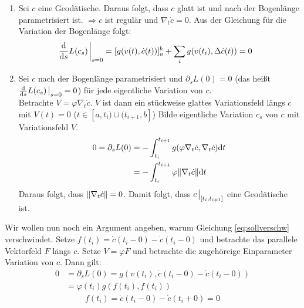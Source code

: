 \begin{bew}
    \begin{enumerate}
        \item Sei $c$ eine Geodätische.
            Daraus folgt, dass $c$ glatt ist und nach der Bogenlänge parametrisiert ist. 
            $\Rightarrow c$ ist regulär und $\nabla_t \dot{c} = 0$. 
            Aus der Gleichung für die Variation der Bogenlänge folgt:
            \begin{align*}
                &\dv{s}L(c_s)\eval_{s = 0} = [g(v(t), \dot{c}(t))]^b_a + \sum_i g(v(t_i), \Delta \dot{c}(t)) = 0
            \end{align*}
        \item Sei $c$ nach der Bogenlänge parametrisiert und $\partial_s L (0) = 0$ (das heißt $\dv{s}L(c_s)\eval_{s=0} = 0$) für jede eigentliche Variation von $c$.\\
            Betrachte $V = \varphi \nabla_t \dot{c}$.
            $V$ ist dann ein stückweise glattes Variationsfeld längs $c$ mit $V(t)=0$ ($t\in [a, t_i) \cup (t_{i + 1}, b]$)
            Bilde eigentliche Variation $c_s$ von $c$ mit Variationsfeld $V$.
            \begin{align}
                \label{eq:sollverschw}
                0 = \partial_s L(0) &= - \int^{t_{i + 1}}_{t_i} g(\varphi \nabla_t \dot{c}, \nabla_t \dot{c}) \dd t\\
                &= - \int^{t_{i+1}}_{t_i} \varphi \norm{\nabla_t \dot{c}} \dd t
            \end{align}
Daraus folgt, dass $\norm{\nabla_t \dot{c}} = 0$.
Damit folgt, dass $c\eval_{[t_i, t_{i+1} ]}$ eine Geodätische ist.
    \end{enumerate}
    Wir wollen nun noch ein Argument angeben, warum Gleichung \ref{eq:sollverschw} verschwindet.
    Setze $f(t_i) = \dot{c}(t_i - 0) - \dot{c}(t_i - 0)$ und betrachte das parallele Vektorfeld $F$ längs $c$.
    Setze $V = \varphi F $ und betrachte die zugehöreige Einparameter Variation von $c$.
    Dann gilt:
    \begin{align*}
        0 &= \partial_s L(0) = g(v(t_i), \dot{c}(t_i - 0) - \dot{c}(t_i - 0))\\
        &= \varphi(t_i) g(f(t_i), f(t_i))
    \end{align*}
\begin{align}
    f(t_i) = \dot{c}(t_i - 0) - \dot{c}(t_i + 0) = 0
\end{align}
\end{bew}
